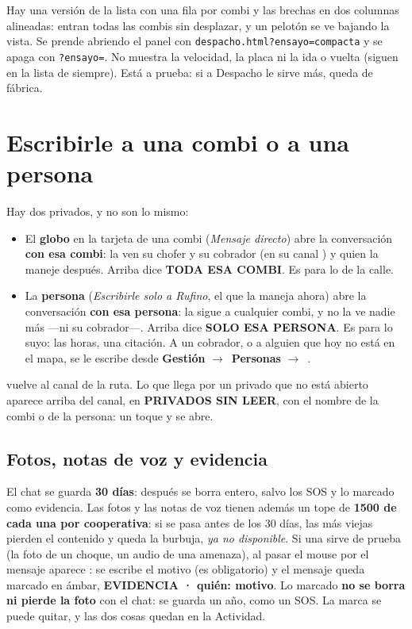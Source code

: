 \documentclass[11pt,a4paper,oneside]{book}
\newcommand{\boton}[1]{\tcbox[on line,boxsep=0pt,left=3pt,right=3pt,top=1.5pt,bottom=1.5pt,
  colback=white,colframe=linea,boxrule=0.5pt,arc=2pt]{\footnotesize\bfseries\color{tinta2}#1}}
\newcommand{\rotulo}[1]{{\footnotesize\bfseries\color{tinta2}\MakeUppercase{#1}}}
\newcommand{\enambar}[1]{{\color{ambar}\bfseries #1}}
\newcommand{\flecha}{$\rightarrow$\ }
\begin{document}
\begin{nota}
Hay una versión de la lista con una fila por combi y las brechas en dos
columnas alineadas: entran todas las combis sin desplazar, y un pelotón se ve
bajando la vista. Se prende abriendo el panel con
\texttt{despacho.html?ensayo=compacta} y se apaga con \texttt{?ensayo=}. No
muestra la velocidad, la placa ni la ida o vuelta (siguen en la lista de
siempre). Está a prueba: si a Despacho le sirve más, queda de fábrica.
\end{nota}

\section{Escribirle a una combi o a una persona}

Hay dos privados, y no son lo mismo:

\begin{itemize}
  \item El \textbf{globo} en la tarjeta de una combi (\emph{Mensaje directo})
    abre la conversación \textbf{con esa combi}: la ven su chofer y su cobrador (en su
    canal \boton{COMBI}) y quien la maneje después. Arriba dice
    \rotulo{toda esa combi}. Es para lo de la calle.
  \item La \textbf{persona} (\emph{Escribirle solo a Rufino}, el que la
    maneja ahora) abre la conversación \textbf{con esa persona}: la sigue a cualquier combi, y no la ve nadie más
    —ni su cobrador—. Arriba dice \rotulo{solo esa persona}. Es para lo suyo:
    las horas, una citación. A un cobrador, o a alguien que hoy no está en el
    mapa, se le escribe desde \textbf{Gestión} \flecha \textbf{Personas} \flecha \boton{Escribir}.
\end{itemize}

\boton{$\leftarrow$ Grupo} vuelve al canal de la ruta. Lo que llega por un
privado que no está abierto aparece arriba del canal, en \rotulo{privados sin
leer}, con el nombre de la combi o de la persona: un toque y se abre.

\subsection*{Fotos, notas de voz y evidencia}

El chat se guarda \textbf{30 días}: después se borra entero, salvo los SOS y
lo marcado como evidencia. Las fotos y las notas de voz tienen además un tope
de \textbf{1500 de cada una por cooperativa}: si se pasa antes de los 30
días, las más viejas pierden el contenido y queda la burbuja, \emph{ya no
disponible}. Si una sirve de prueba (la foto de
un choque, un audio de una amenaza), al pasar el mouse por el mensaje aparece
\boton{Guardar como evidencia}: se escribe el motivo (es obligatorio) y el
mensaje queda marcado en ámbar, \enambar{EVIDENCIA · quién: motivo}. Lo marcado
\textbf{no se borra ni pierde la foto} con el chat: se guarda un año, como un
SOS. La marca se puede quitar, y las dos cosas quedan en la Actividad.
\end{document}
